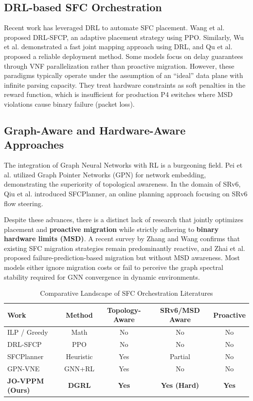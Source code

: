 \documentclass[12pt, a4paper, reqno, oneside]{book}
\begin{document}
\subsection{DRL-based SFC Orchestration}
Recent work has leveraged DRL to automate SFC placement. Wang et al. \cite{wang2021drl} proposed DRL-SFCP, an adaptive placement strategy using PPO. Similarly, Wu et al. \cite{wu2025drl} demonstrated a fast joint mapping approach using DRL, and Qu et al. \cite{qu2021reliable} proposed a reliable deployment method. Some models focus on delay guarantees through VNF parallelization \cite{liu2025delay} rather than proactive migration. However, these paradigms typically operate under the assumption of an ``ideal'' data plane with infinite parsing capacity. They treat hardware constraints as soft penalties in the reward function, which is insufficient for production P4 switches where MSD violations cause binary failure (packet loss).

\subsection{Graph-Aware and Hardware-Aware Approaches}
The integration of Graph Neural Networks with RL is a burgeoning field. Pei et al. \cite{pei2025graph} utilized Graph Pointer Networks (GPN) for network embedding, demonstrating the superiority of topological awareness. In the domain of SRv6, Qiu et al. \cite{qiu2024sfcplanner} introduced SFCPlanner, an online planning approach focusing on SRv6 flow steering. 

Despite these advances, there is a distinct lack of research that jointly optimizes placement and \textbf{proactive migration} while strictly adhering to \textbf{binary hardware limits (MSD)}. A recent survey by Zhang and Wang \cite{zhang2025sfcmigration} confirms that existing SFC migration strategies remain predominantly reactive, and Zhai et al. \cite{zhai2023migration} proposed failure-prediction-based migration but without MSD awareness. Most models either ignore migration costs or fail to perceive the graph spectral stability required for GNN convergence in dynamic environments.

\begin{table}[H]
\centering
\caption{Comparative Landscape of SFC Orchestration Literatures}
\label{table:literature_comparison}
\begin{tabular}{lcccc}
\toprule
\textbf{Work} & \textbf{Method} & \textbf{Topology-Aware} & \textbf{SRv6/MSD Aware} & \textbf{Proactive} \\
\midrule
ILP / Greedy & Math & No & No & No \\
DRL-SFCP \cite{wang2021drl} & PPO & No & No & No \\
SFCPlanner \cite{qiu2024sfcplanner} & Heuristic & Yes & Partial & No \\
GPN-VNE \cite{pei2025graph} & GNN+RL & Yes & No & No \\
\textbf{JO-VPPM (Ours)} & \textbf{DGRL} & \textbf{Yes} & \textbf{Yes (Hard)} & \textbf{Yes} \\
\bottomrule
\end{tabular}
\end{table}
\end{document}
